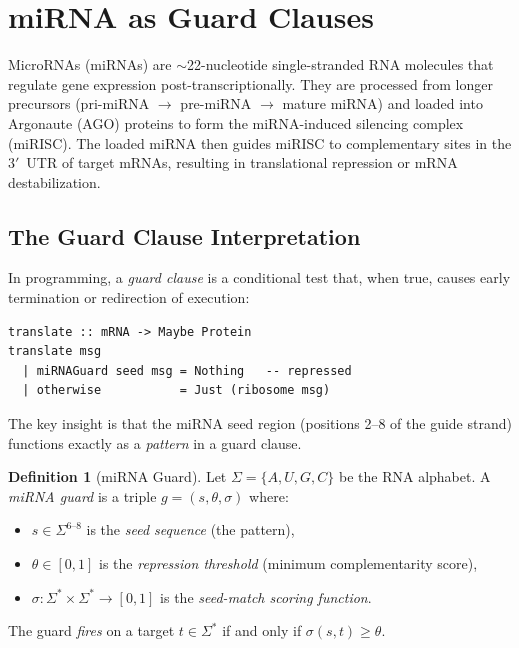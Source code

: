 \documentclass[12pt,a4paper]{article}
\theoremstyle{definition}
\newtheorem{definition}[theorem]{Definition}
\begin{document}
\section{miRNA as Guard Clauses}\label{sec:mirna}

MicroRNAs (miRNAs) are $\sim$22-nucleotide single-stranded RNA molecules
that regulate gene expression post-transcriptionally.  They are processed
from longer precursors (pri-miRNA $\to$ pre-miRNA $\to$ mature miRNA)
and loaded into Argonaute (AGO) proteins to form the miRNA-induced
silencing complex (miRISC).  The loaded miRNA then guides miRISC to
complementary sites in the 3\('\)~UTR of target mRNAs, resulting in
translational repression or mRNA destabilization.

\subsection{The Guard Clause Interpretation}

In programming, a \emph{guard clause} is a conditional test that, when
true, causes early termination or redirection of execution:

\begin{lstlisting}
translate :: mRNA -> Maybe Protein
translate msg
  | miRNAGuard seed msg = Nothing   -- repressed
  | otherwise           = Just (ribosome msg)
\end{lstlisting}

The key insight is that the miRNA seed region (positions 2--8 of the
guide strand) functions exactly as a \emph{pattern} in a guard clause.

\begin{definition}[miRNA Guard]\label{def:mirna-guard}
Let $\Sigma = \{A, U, G, C\}$ be the RNA alphabet.  A \emph{miRNA guard}
is a triple $g = (s, \theta, \sigma)$ where:
\begin{itemize}
  \item $s \in \Sigma^{6\text{--}8}$ is the \emph{seed sequence}
    (the pattern),
  \item $\theta \in [0,1]$ is the \emph{repression threshold}
    (minimum complementarity score),
  \item $\sigma : \Sigma^* \times \Sigma^* \to [0,1]$ is the
    \emph{seed-match scoring function}.
\end{itemize}
The guard \emph{fires} on a target $t \in \Sigma^*$ if and only if
$\sigma(s, t) \geq \theta$.
\end{definition}
\end{document}
